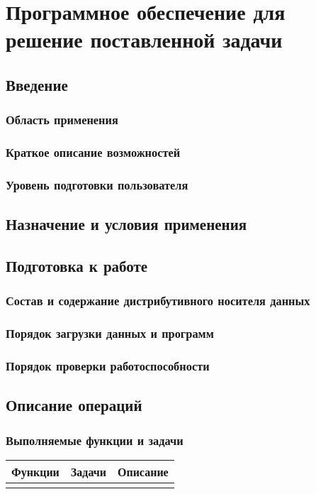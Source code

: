 \section{Программное обеспечение для решение поставленной задачи}

\subsection{Введение}

\subsubsection{Область применения}
\subsubsection{Краткое описание возможностей}
\subsubsection{Уровень подготовки пользователя}

\subsection{Назначение и условия применения}

\subsection{Подготовка к работе}
\subsubsection{Состав и содержание дистрибутивного носителя данных}
\subsubsection{Порядок загрузки данных и программ}
\subsubsection{Порядок проверки работоспособности}

\subsection{Описание операций}
\subsubsection{Выполняемые функции и задачи}
\begin{longtable}{|p{3cm}|p{4cm}|p{8cm}|}
\hline
Функции & Задачи & Описание\\
\hline
 &   & \\
\hline
\end{longtable}

